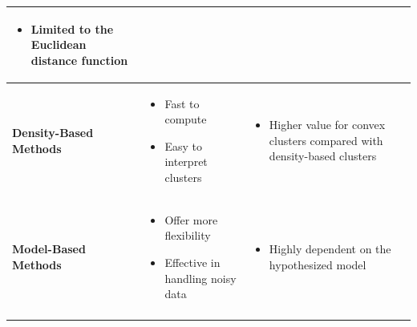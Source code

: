 \begin{table}[!ht]
\begin{tabularx}{\linewidth}{p{3cm} p{5.5cm} p{5.5cm}}
\begin{itemize}[*,nosep,leftmargin=0.2cm]
    \item Limited to the Euclidean distance function
\end{itemize}
\tabularnewline \hline
\vfill
 \textbf{Density-Based Methods}
& 
\begin{itemize}[*,nosep,leftmargin=0.2cm]
    \item Fast to compute
    \item Easy to interpret clusters %
\end{itemize}
 &       
\begin{itemize}[*,nosep,leftmargin=0.2cm]
    \item Higher value for convex clusters compared with density-based clusters
\end{itemize}
\tabularnewline \hline
\vfill
 \textbf{Model-Based Methods}
& 
\begin{itemize}[*,nosep,leftmargin=0.2cm]
    \item Offer more flexibility
    \item Effective in handling noisy data            
\end{itemize}
 &       
\begin{itemize}[*,nosep,leftmargin=0.2cm]
    \item Highly dependent on the hypothesized model
\end{itemize} 
\tabularnewline \hline
\vfill
\end{tabularx}
\end{table}



